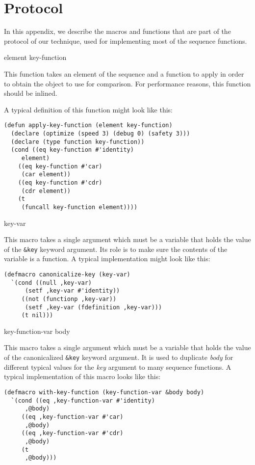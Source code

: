 \appendix

\section{Protocol}

In this appendix, we describe the macros and functions that are part
of the protocol of our technique, used for implementing most of the
sequence functions.

 {element key-function}

This function takes an element of the sequence and a function to apply
in order to obtain the object to use for comparison.  For performance
reasons, this function should be inlined.

A typical definition of this function might look like this:

{\small\begin{verbatim}
(defun apply-key-function (element key-function)
  (declare (optimize (speed 3) (debug 0) (safety 3)))
  (declare (type function key-function))
  (cond ((eq key-function #'identity)
	 element)
	((eq key-function #'car)
	 (car element))
	((eq key-function #'cdr)
	 (cdr element))
	(t
	 (funcall key-function element))))
\end{verbatim}}

 {key-var}

This macro takes a single argument which must be a variable that holds
the value of the \texttt{\&key} keyword argument.  Its role is to make
sure the contents of the variable is a function.  A typical
implementation might look like this:

{\small\begin{verbatim}
(defmacro canonicalize-key (key-var)
  `(cond ((null ,key-var)
	  (setf ,key-var #'identity))
	 ((not (functionp ,key-var))
	  (setf ,key-var (fdefinition ,key-var)))
	 (t nil)))
\end{verbatim}}

 {key-function-var \body body}

This macro takes a single argument which must be a variable that holds
the value of the canonicalized \texttt{\&key} keyword argument.  It is
used to duplicate \textit{body} for different typical values for the
\textit{key} argument to many sequence functions.  A typical
implementation of this macro looks like this:

{\small\begin{verbatim}
(defmacro with-key-function (key-function-var &body body)
  `(cond ((eq ,key-function-var #'identity)
	  ,@body)
	 ((eq ,key-function-var #'car)
	  ,@body)
	 ((eq ,key-function-var #'cdr)
	  ,@body)
	 (t
	  ,@body)))
\end{verbatim}}

